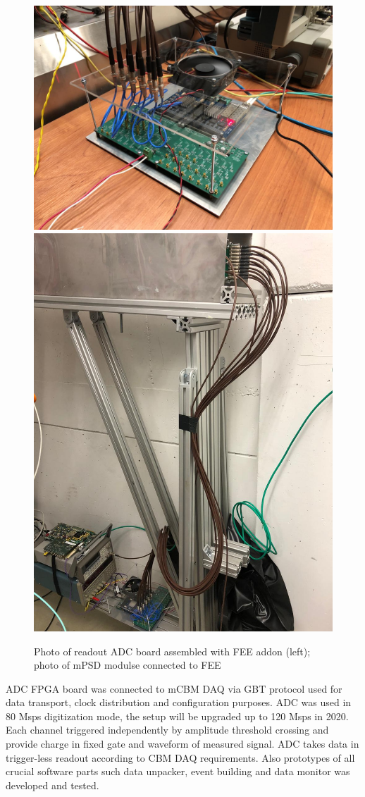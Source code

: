 \documentclass[a4paper,11pt]{article}
\begin{document}
\begin{figure}[htbp]
\centering %
\includegraphics[width=.5\textwidth]{mPSD_FEE_photo.jpeg}
\qquad
\includegraphics[width=.3\textwidth]{mPSD_module_photo.jpeg}
\caption{\label{fig:4} Photo of readout ADC board assembled with FEE addon (left); photo of mPSD modulse connected to FEE}
\end{figure}

ADC FPGA board was connected to mCBM DAQ via GBT protocol used for data transport, clock distribution and configuration purposes. ADC was used in 80 Msps digitization mode, the setup will be upgraded up to 120 Msps in 2020. Each channel triggered independently by amplitude threshold crossing and provide charge in fixed gate and waveform of measured signal. ADC takes data in trigger-less readout according to CBM DAQ requirements. Also prototypes of all crucial software parts such data unpacker, event building and data monitor was developed and tested.
\end{document}
